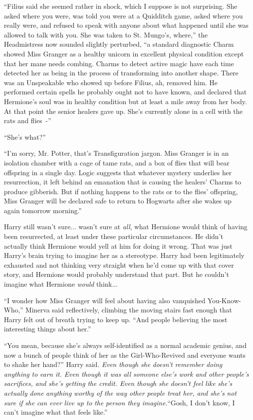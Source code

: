 ``Filius said she seemed rather in shock, which I suppose is not surprising. She asked where you were, was told you were at a Quidditch game, asked where you really were, and refused to speak with anyone about what happened until she was allowed to talk with you. She was taken to St. Mungo's, where,'' the Headmistress now sounded slightly perturbed, ``a standard diagnostic Charm showed Miss Granger as a healthy unicorn in excellent physical condition except that her mane needs combing. Charms to detect active magic have each time detected her as being in the process of transforming into another shape. There was an Unspeakable who showed up before Filius, ah, removed him. He performed certain spells he probably ought not to have known, and declared that Hermione's soul was in healthy condition but at least a mile away from her body. At that point the senior healers gave up. She's currently alone in a cell with the rats and flies~-''

``She's what?''

``I'm sorry, Mr. Potter, that's Transfiguration jargon. Miss Granger is in an isolation chamber with a cage of tame rats, and a box of flies that will bear offspring in a single day. Logic suggests that whatever mystery underlies her resurrection, it left behind an emanation that is causing the healers' Charms to produce gibberish. But if nothing happens to the rats or to the flies' offspring, Miss Granger will be declared safe to return to Hogwarts after she wakes up again tomorrow morning.''

Harry still wasn't sure... wasn't sure at \emph{all}, what Hermione would think of having been resurrected, at least under these particular circumstances. He didn't actually think Hermione would yell at him for doing it wrong. That was just Harry's brain trying to imagine her as a stereotype. Harry had been legitimately exhausted and not thinking very straight when he'd come up with that cover story, and Hermione would probably understand that part. But he couldn't imagine what Hermione \emph{would} think...

``I wonder how Miss Granger will feel about having also vanquished You-Know-Who,'' Minerva said reflectively, climbing the moving stairs fast enough that Harry felt out of breath trying to keep up. ``And people believing the most interesting things about her.''

``You mean, because she's always self-identified as a normal academic genius, and now a bunch of people think of her as the Girl-Who-Revived and everyone wants to shake her hand?'' Harry said. \emph{Even though she doesn't remember doing anything to earn it. Even though it was all someone else's work and other people's sacrifices, and she's getting the credit. Even though she doesn't feel like she's actually done anything worthy of the way other people treat her, and she's not sure if she can ever live up to the person they imagine.}``Gosh, I don't know, I can't imagine what that feels like.''

